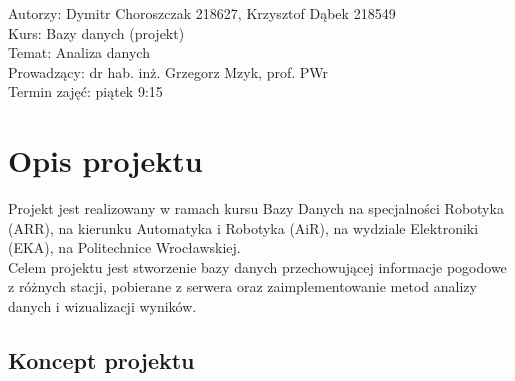 \documentclass[12pt,a4paper]{article}
\begin{document}
\vspace{20pt}

\flushleft Autorzy: Dymitr Choroszczak 218627, Krzysztof Dąbek 218549\\
Kurs: Bazy danych (projekt)\\
Temat: Analiza danych\\
Prowadzący: dr hab. inż. Grzegorz Mzyk, prof. PWr\\
Termin zajęć: piątek 9:15\\


\newpage

\tableofcontents

\newpage

\section{Opis projektu}
\normalsize
Projekt jest realizowany w ramach kursu Bazy Danych na specjalności Robotyka (ARR), na kierunku Automatyka i Robotyka (AiR), na wydziale Elektroniki (EKA), na Politechnice Wrocławskiej.\\
Celem projektu jest stworzenie bazy danych przechowującej informacje pogodowe z różnych stacji, pobierane z serwera oraz zaimplementowanie metod analizy danych i wizualizacji wyników.\\


\subsection{Koncept projektu}
\end{document}
